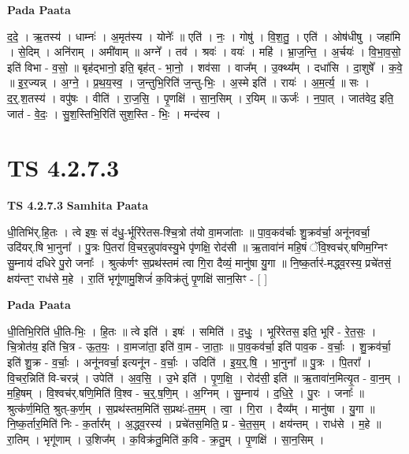 \documentclass[17pt]{extarticle}
\begin{document}
\textbf{Pada Paata} \newline

द॒दे॒ । ऋ॒तस्य॑ । धाम्नः॑ । अ॒मृत॑स्य । योनेः᳚ ॥ एति॑ । नः॒ । गोषु॑ । वि॒श॒तु॒ । एति॑ । ओष॑धीषु । जहा॑मि । से॒दिम् । अनि॑राम् । अमी॑वाम् ॥ अग्ने᳚ । तव॑ । श्रवः॑ । वयः॑ । महि॑ । भ्रा॒ज॒न्ति॒ । अ॒र्चयः॑ । वि॒भा॒व॒सो॒ इति॑ विभा - व॒सो॒ ॥ बृह॑द्भानो॒ इति॒ बृह॑त् - भा॒नो॒ । शव॑सा । वाज᳚म् । उ॒क्थ्य᳚म् । दधा॑सि । दा॒शुषे᳚ । क॒वे॒ ॥ इ॒र॒ज्यन्न् । अ॒ग्ने॒ । प्र॒थ॒य॒स्व॒ । ज॒न्तुभि॒रिति॑ ज॒न्तु-भिः॒ । अ॒स्मे इति॑ । रायः॑ । अ॒म॒र्त्य॒ ॥ सः । द॒र्॒.श॒तस्य॑ । वपु॑षः । वीति॑ । रा॒ज॒सि॒ । पृ॒णक्षि॑ । सा॒न॒सिम् । र॒यिम् ॥ ऊर्जः॑ । न॒पा॒त् । जात॑वेद॒ इति॒ जात॑ - वे॒दः॒ । सु॒श॒स्तिभि॒रिति॑ सुश॒स्ति - भिः॒ । मन्द॑स्व ।  \newline





\section{ TS 4.2.7.3 }

\textbf{TS 4.2.7.3 } \newline
\textbf{Samhita Paata} \newline

धी॒तिभि॑र्.हि॒तः । त्वे इषः॒ सं द॑धु॒-र्भूरि॑रेतस-श्चि॒त्रो त॑यो वा॒मजा॑ताः ॥ पा॒व॒कव॑र्चाः शु॒क्रव॑र्चा॒ अनू॑नवर्चा॒ उदि॑यर्.षि भा॒नुना᳚ । पु॒त्रः पि॒तरा॑ वि॒चर॒न्नुपा॑वस्यु॒भे पृ॑णक्षि॒ रोद॑सी ॥ ऋ॒तावा॑नं महि॒षं ॅवि॒श्वच॑र्.षणिम॒ग्निꣳ सु॒म्नाय॑ दधिरे पु॒रो जनाः᳚ । श्रुत्क॑र्णꣳ स॒प्रथ॑स्तमं त्वा गि॒रा दैव्यं॒ मानु॑षा यु॒गा ॥ नि॒ष्क॒र्तार॑-मद्ध्व॒रस्य॒ प्रचे॑तसं॒ क्षय॑न्तꣳ॒॒ राध॑से म॒हे । रा॒तिं भृगू॑णामु॒शिजं॑ क॒विक्र॑तुं पृ॒णक्षि॑ सान॒सिꣳ - [  ] \newline

\textbf{Pada Paata} \newline

धी॒तिभि॒रिति॑ धी॒ति-भिः॒ । हि॒तः ॥ त्वे इति॑ । इषः॑ । समिति॑ । द॒धुः॒ । भूरि॑रेतस॒ इति॒ भूरि॑ - रे॒त॒सः॒ । चि॒त्रोत॑य॒ इति॑ चि॒त्र - ऊ॒त॒यः॒ । वा॒मजा॑ता॒ इति॑ वा॒म - जा॒ताः॒ ॥ पा॒व॒कव॑र्चा॒ इति॑ पाव॒क - व॒र्चाः॒ । शु॒क्रव॑र्चा॒ इति॑ शु॒क्र - व॒र्चाः॒ । अनू॑नवर्चा॒ इत्यनू॑न - व॒र्चाः॒ । उदिति॑ । इ॒य॒र्॒.षि॒ । भा॒नुना᳚ ॥ पु॒त्रः । पि॒तरा᳚ । वि॒चर॒न्निति॑ वि-चरन्न्॑ । उपेति॑ । अ॒व॒सि॒ । उ॒भे इति॑ । पृ॒ण॒क्षि॒ । रोद॑सी॒ इति॑ ॥ ऋ॒तावा॑न॒मित्यृ॒त - वा॒न॒म् । म॒हि॒षम् । वि॒श्वच॑र्.षणि॒मिति॑ वि॒श्व - च॒र्॒.ष॒णि॒म् । अ॒ग्निम् । सु॒म्नाय॑ । द॒धि॒रे॒ । पु॒रः । जनाः᳚ ॥ श्रुत्क॑र्ण॒मिति॒ श्रुत्-क॒र्ण॒म् । स॒प्रथ॑स्तम॒मिति॑ स॒प्रथः॑-त॒म॒म् । त्वा॒ । गि॒रा । दैव्य᳚म् । मानु॑षा । यु॒गा ॥ नि॒ष्क॒र्तार॒मिति॑ निः - क॒र्तार᳚म् । अ॒द्ध्व॒रस्य॑ । प्रचे॑तस॒मिति॒ प्र - चे॒त॒स॒म् । क्षय॑न्तम् । राध॑से । म॒हे ॥ रा॒तिम् । भृगू॑णाम् । उ॒शिज᳚म् । क॒विक्र॑तु॒मिति॑ क॒वि - क्र॒तु॒म् । पृ॒णक्षि॑ । सा॒न॒सिम् ।  \newline
\end{document}
